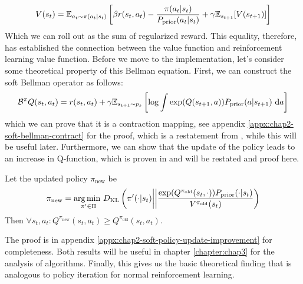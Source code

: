 \begin{equation}
    V(s_t) = \mathbb{E}_{a_t \sim \pi(a_t | s_t)} \left[\beta r(s_t, a_t) - \frac{\pi(a_t | s_t)}{P_{\text{prior}}(a_t | s_t)} + \gamma\mathbb{E}_{s_{t+1}}[V(s_{t+1})]\right]
\end{equation}
Which we can roll out as the sum of regularized reward. This equality, therefore, has established the connection between the value function and reinforcement learning value function. Before we move to the implementation, let's consider some theoretical property of this Bellman equation. First, we can construct the soft Bellman operator as follows: 
\begin{equation}
    \mathcal{B}^{\pi} Q(s_t, a_t) = r(s_t, a_t) + \gamma \mathbb{E}_{s_{t+1} \sim p_{s}}\left[ \log \int \exp(Q(s_{t+1}, a)) P_{\text{prior}}(a | s_{t+1}) \ \mathrm{d} a \right]
\end{equation}
which we can prove that it is a contraction mapping, see appendix \ref{appx:chap2-soft-bellman-contract} for the proof, which is a restatement from \cite{haarnoja2017reinforcement}, while this will be useful later. Furthermore, we can show that the update of the policy leads to an increase in Q-function, which is proven in \cite{haarnoja2018softa} and will be restated and proof here. 
\begin{theorem}
    Let the updated policy $\pi_{\text{new}}$ be 
    \begin{equation}
        \pi_{\text{new}} = \underset{\pi' \in \Pi}{\arg\min \ } D_{\mathrm{KL}}\left( \pi'(\cdot | s_t) \bigg|\bigg| \frac{\exp(Q^{\pi_{\text{old}}}(s_t, \cdot)) P_{\text{prior}}(\cdot | s_t)}{V^{\pi_{\text{old}}}(s_t)} \right)
    \end{equation}
    Then $\forall s_t, a_t : Q^{\pi_{\text{new}}}(s_t, a_t) \ge Q^{\pi_{\text{old}}}(s_t, a_t) $.
\end{theorem}
The proof is in appendix \ref{appx:chap2-soft-policy-update-improvement} for completeness. Both results will be useful in chapter \ref{chapter:chap3} for the analysis of algorithms. Finally, this gives us the basic theoretical finding that is analogous to policy iteration for normal reinforcement learning.


